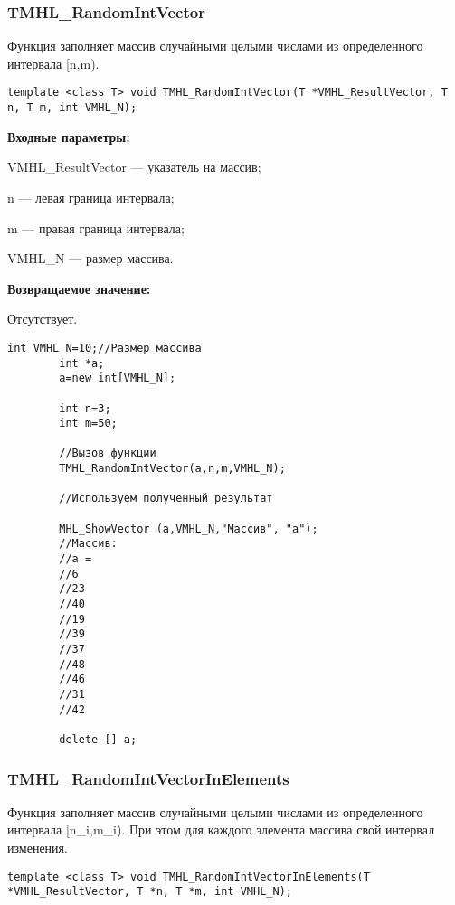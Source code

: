 \documentclass[a4paper,12pt]{article}
\begin{document}
\subsubsection{TMHL\_RandomIntVector}\label{TMHL_RandomIntVector}

Функция заполняет массив случайными целыми числами из определенного интервала [n,m).


\begin{lstlisting}[label=code_syntax_TMHL_RandomIntVector,caption=Синтаксис]
template <class T> void TMHL_RandomIntVector(T *VMHL_ResultVector, T n, T m, int VMHL_N);
\end{lstlisting}

\textbf{Входные параметры:}
 
VMHL\_ResultVector --- указатель на массив;
 
n --- левая граница интервала;
 
m --- правая граница интервала;
 
VMHL\_N --- размер массива.

\textbf{Возвращаемое значение:}

Отсутствует.


\begin{lstlisting}[label=code_use_TMHL_RandomIntVector,caption=Пример использования]
        int VMHL_N=10;//Размер массива
        int *a;
        a=new int[VMHL_N];

        int n=3;
        int m=50;

        //Вызов функции
        TMHL_RandomIntVector(a,n,m,VMHL_N);

        //Используем полученный результат

        MHL_ShowVector (a,VMHL_N,"Массив", "a");
        //Массив:
        //a =
        //6
        //23
        //40
        //19
        //39
        //37
        //48
        //46
        //31
        //42

        delete [] a;
\end{lstlisting}

\subsubsection{TMHL\_RandomIntVectorInElements}\label{TMHL_RandomIntVectorInElements}

Функция заполняет массив случайными целыми  числами из определенного интервала [n\_i,m\_i). При этом для каждого элемента массива свой интервал изменения.


\begin{lstlisting}[label=code_syntax_TMHL_RandomIntVectorInElements,caption=Синтаксис]
template <class T> void TMHL_RandomIntVectorInElements(T *VMHL_ResultVector, T *n, T *m, int VMHL_N);
\end{lstlisting}
\end{document}
